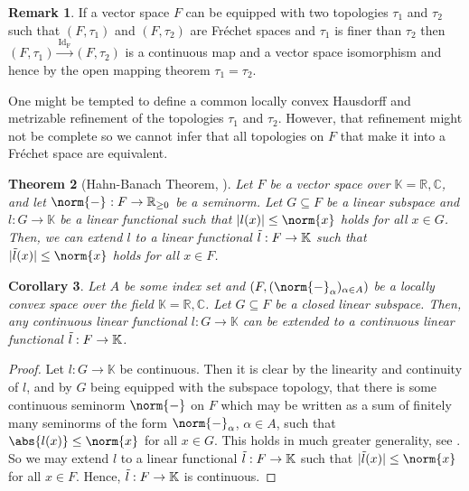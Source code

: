 \documentclass[12pt,a4paper]{article}
\theoremstyle{plain}
\newtheorem{theorem}{Theorem}[subsection]
\newtheorem{corollary}[theorem]{Corollary}
\theoremstyle{definition}
\newtheorem{remark}[theorem]{Remark}
\newcommand{\R}{\mathbb{R}}
\newcommand{\K}{\mathbb{K}}
\newcommand{\nnorm}[2]{\norm{#1}_{#2}}
\begin{document}
\begin{remark}
\label{Rem:FreFinerTop}
If a vector space $F$ can be equipped with two topologies $\tau_1$ and $\tau_2$ such that $(F,\tau_1)$ and $(F,\tau_2)$ are Fréchet spaces and $\tau_1$ is finer than $\tau_2$ then $(F,\tau_1)\xrightarrow{\mathrm{Id_F}}(F,\tau_2)$ is a continuous map and a vector space isomorphism and hence by the open mapping theorem $\tau_1=\tau_2$.

One might be tempted to define a common locally convex Hausdorff and metrizable refinement of the topologies $\tau_1$ and $\tau_2$. However, that refinement might not be complete so we cannot infer that all topologies on $F$ that make it into a Fréchet space are equivalent.
\end{remark}


\begin{theorem}[Hahn-Banach Theorem, {\cite[Theorem 5.1.1]{TVSc}}]
\label{Thm:GenHahnBanach}
Let $F$ be a vector space over $\K=\R,\mathbb C$, and let $\nnorm{-}{}:F\to \R_{\geq 0}$ be a seminorm. Let $G\subseteq F$ be a linear subspace and $l:G \to \K$ be a linear functional such that 
$|l(x)|\leq \nnorm{x}{}$
holds for all $x\in G$. 
Then, we can extend $l$ to a linear functional $\Tilde{l}:F\to \K$ such that
$|\Tilde l(x)|\leq \nnorm{x}{}$
holds for all $x\in F$.
\end{theorem}

\begin{corollary}
\label{Cor:HahnBanachForLocConv}
Let $A$ be some index set and $(F,(\nnorm{-}{\alpha})_{\alpha\in A})$ be a locally convex space over the field $\K=\R,\mathbb C$. Let $G\subseteq F$ be a closed linear subspace. Then, any continuous linear functional $l:G\to \K$ can be extended to a continuous linear functional $\Tilde{l}:F\to \K$.
\end{corollary}
\begin{proof}
Let $l:G\to \K$ be continuous. Then it is clear by the linearity and continuity of $l$, and by $G$ being equipped with the subspace topology, that there is some continuous seminorm $\nnorm{-}{}$ on $F$ which may be written as a sum of finitely many seminorms of the form $\nnorm{-}{\alpha}$, $\alpha\in A$, such that $\abs{l(x)}\leq \nnorm{x}{}$ for all $x\in G$. This holds in much greater generality, see \cite[Proposition 4.6.1]{TVSc}.
So we may extend $l$ to a linear functional $\Tilde{l}:F\to \K$ such that $|\Tilde{l}(x)|\leq \nnorm{x}{}$ for all $x\in F$. Hence, $\Tilde{l}:F\to \K$ is continuous.
\end{proof} 
\end{document}
